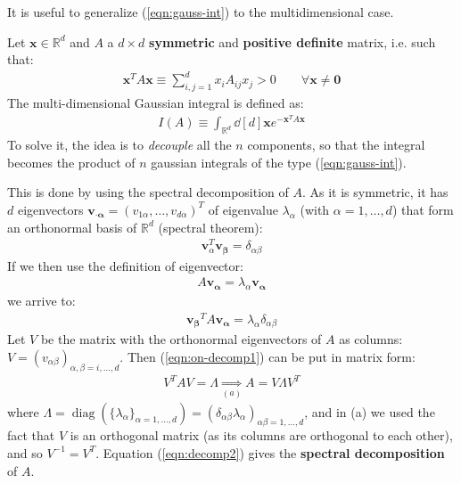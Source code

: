 \documentclass[../../main.tex]{subfiles}
\begin{document}
It is useful to generalize (\ref{eqn:gauss-int}) to the multidimensional case.

Let $\bm{x} \in \mathbb{R}^d$ and $A$ a $d\times d$ \textbf{symmetric} and \textbf{positive definite} matrix, i.e. such that:
\begin{align}\label{eqn:pos-def}
    \bm{x}^T A \bm{x} \equiv \sum_{i,j=1}^d x_i A_{ij} x_j > 0 \qquad \forall \bm{x} \neq \bm{0}
\end{align}  
The multi-dimensional Gaussian integral is defined as:
\begin{align*}
    I(A) \equiv \int_{\mathbb{R}^d} \dd[d]{\bm{x}} e^{-\bm{x}^T A \bm{x}}
\end{align*}
To solve it, the idea is to \textit{decouple} all the $n$ components, so that the integral becomes the product of $n$ gaussian integrals of the type (\ref{eqn:gauss-int}).

\medskip

This is done by using the spectral decomposition of $A$. As it is symmetric, it has $d$ eigenvectors $\bm{v_{\cdot\alpha}} = (v_{1\alpha}, \dots, v_{d \alpha})^T$ of eigenvalue $\lambda_\alpha$ (with $\alpha =1, \dots, d$) that form an orthonormal basis of $\mathbb{R}^d$ (spectral theorem):
\begin{align*}
    \bm{v}_\alpha^T \bm{v_\beta} = \delta_{\alpha \beta}
\end{align*}
If we then use the definition of eigenvector:
\begin{align*}
    A \bm{v_\alpha} = \lambda_\alpha \bm{v_\alpha}
\end{align*}
we arrive to:
\begin{align}
    \bm{v_\beta}^T A \bm{v_\alpha} = \lambda_\alpha \delta_{\alpha \beta} \label{eqn:on-decomp1}
\end{align}
Let $V$ be the matrix with the orthonormal eigenvectors of $A$ as columns: $V=(v_{\alpha \beta})_{\alpha, \beta=i,\dots, d}$. Then (\ref{eqn:on-decomp1}) can be put in matrix form:
\begin{align}\label{eqn:decomp2}
    V^T A V = \Lambda \underset{(a)}{\Rightarrow}  A =V \Lambda V^T
\end{align}
where $\Lambda = \operatorname{diag}(\{\lambda_\alpha\}_{\alpha=1,\dots,d}) = (\delta_{\alpha \beta} \lambda_\alpha)_{\alpha \beta=1, \dots, d}$, and in (a)
we used the fact that $V$ is an orthogonal matrix (as its columns are orthogonal to each other), and so $V^{-1} = V^T$. Equation (\ref{eqn:decomp2}) gives the \textbf{spectral decomposition}  of $A$.
\end{document}

